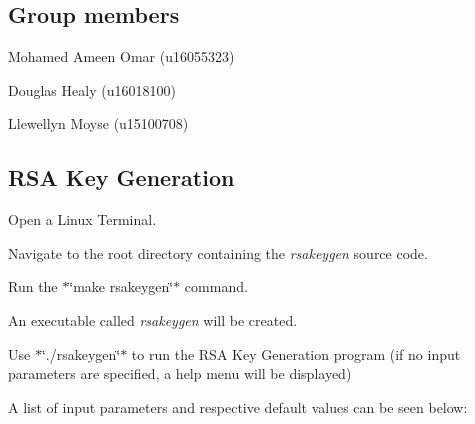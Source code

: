 \subsection*{Group members}


\begin{DoxyItemize}
\item Mohamed Ameen Omar (u16055323)
\item Douglas Healy (u16018100)
\item Llewellyn Moyse (u15100708)
\end{DoxyItemize}





\subsection*{R\+SA Key Generation}


\begin{DoxyEnumerate}
\item Open a Linux Terminal.
\item Navigate to the root directory containing the {\itshape rsakeygen} source code.
\item Run the $\ast$\char`\"{}make rsakeygen\char`\"{}$\ast$ command.
\item An executable called {\itshape rsakeygen} will be created.
\item Use $\ast$\char`\"{}./rsakeygen\char`\"{}$\ast$ to run the R\+SA Key Generation program (if no input parameters are specified, a help menu will be displayed)
\item A list of input parameters and respective default values can be seen below\+:
\end{DoxyEnumerate}

